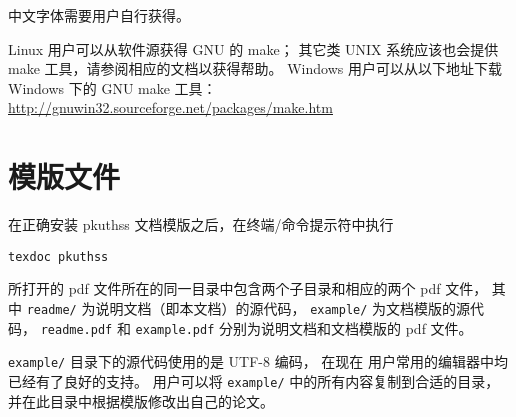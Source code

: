 	中文字体需要用户自行获得。

	Linux 用户可以从软件源获得 GNU 的 make；
	其它类 UNIX 系统应该也会提供 make 工具，请参阅相应的文档以获得帮助。%
	Windows 用户可以从以下地址下载 Windows 下的 GNU make 工具：\\
	\hspace*{\parindent}%
	\url{http://gnuwin32.sourceforge.net/packages/make.htm}

	\section{模版文件}\label{sec:doc-dir}

	在正确安装 pkuthss 文档模版之后，在终端/命令提示符中执行
\begin{Verbatim}[frame = single]
texdoc pkuthss
\end{Verbatim}
	所打开的 pdf 文件所在的同一目录中包含两个子目录和相应的两个 pdf 文件，
	其中 \verb|readme/| 为说明文档（即本文档）的源代码，%
	\verb|example/| 为文档模版的源代码，%
	\verb|readme.pdf| 和 \verb|example.pdf|
	分别为说明文档和文档模版的 pdf 文件。

	\verb|example/| 目录下的源代码使用的是 UTF-8 编码，
	在现在  用户常用的编辑器中均已经有了良好的支持。
	用户可以将 \verb|example/| 中的所有内容复制到合适的目录，
	并在此目录中根据模版修改出自己的论文。


